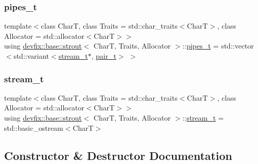 \subsubsection{\texorpdfstring{pipes\+\_\+t}{pipes\_t}}
{\footnotesize\ttfamily template$<$class CharT, class Traits = std\+::char\+\_\+traits$<$\+Char\+T$>$, class Allocator = std\+::allocator$<$\+Char\+T$>$$>$ \\
using \hyperlink{structdevfix_1_1base_1_1strout}{devfix\+::base\+::strout}$<$ CharT, Traits, Allocator $>$\+::\hyperlink{structdevfix_1_1base_1_1strout_acf852ff3e37e6d10e2cf0332df2b8e2d}{pipes\+\_\+t} =  std\+::vector$<$std\+::variant$<$\hyperlink{structdevfix_1_1base_1_1strout_a158aadfad348eeac7c56a8b43699a4d3}{stream\+\_\+t}$\ast$, \hyperlink{structdevfix_1_1base_1_1strout_a2212cb8a99abec10490e891cc67820bb}{pair\+\_\+t}$>$ $>$}

\mbox{\label{structdevfix_1_1base_1_1strout_a158aadfad348eeac7c56a8b43699a4d3}} 
\subsubsection{\texorpdfstring{stream\+\_\+t}{stream\_t}}
{\footnotesize\ttfamily template$<$class CharT, class Traits = std\+::char\+\_\+traits$<$\+Char\+T$>$, class Allocator = std\+::allocator$<$\+Char\+T$>$$>$ \\
using \hyperlink{structdevfix_1_1base_1_1strout}{devfix\+::base\+::strout}$<$ CharT, Traits, Allocator $>$\+::\hyperlink{structdevfix_1_1base_1_1strout_a158aadfad348eeac7c56a8b43699a4d3}{stream\+\_\+t} =  std\+::basic\+\_\+ostream$<$CharT$>$}



\subsection{Constructor \& Destructor Documentation}
\mbox{\label{structdevfix_1_1base_1_1strout_a7711671b7f3457ed5cc509f7d7c7239f}} 
